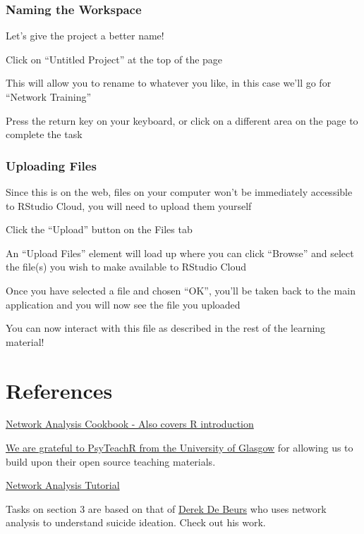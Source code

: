 \documentclass[]{book}
\begin{document}
\hypertarget{naming-the-workspace}{%
\subsection{Naming the Workspace}\label{naming-the-workspace}}

Let's give the project a better name!

Click on ``Untitled Project'' at the top of the page

This will allow you to rename to whatever you like, in this case we'll go for ``Network Training''

Press the return key on your keyboard, or click on a different area on the page to complete the task

\hypertarget{uploading-files}{%
\subsection{Uploading Files}\label{uploading-files}}

Since this is on the web, files on your computer won't be immediately accessible to RStudio Cloud, you will need to upload them yourself

Click the ``Upload'' button on the Files tab

An ``Upload Files'' element will load up where you can click ``Browse'' and select the file(s) you wish to make available to RStudio Cloud

Once you have selected a file and chosen ``OK'', you'll be taken back to the main application and you will now see the file you uploaded

You can now interact with this file as described in the rest of the learning material!

\hypertarget{references}{%
\chapter{References}\label{references}}

\href{http://sachaepskamp.com/files/Cookbook.html}{Network Analysis Cookbook - Also covers R introduction}

\href{https://psyteachr.github.io/}{We are grateful to PsyTeachR from the University of Glasgow} for allowing us to build upon their open source teaching materials.

\href{https://www.tandfonline.com/doi/full/10.1080/21642850.2018.1521283}{Network Analysis Tutorial}

Tasks on section 3 are based on that of \href{http://www.derekdebeurs.com/about}{Derek De Beurs} who uses network analysis to understand suicide ideation. Check out his work.


\end{document}
